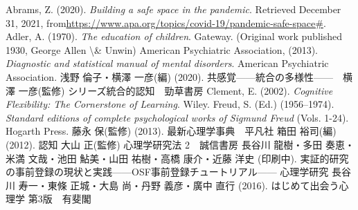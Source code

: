  Abrams, Z. (2020). \textit{Building a safe space in the pandemic}. Retrieved December 31, 2021, from\url{https://www.apa.org/topics/covid-19/pandemic-safe-space#}.
 Adler, A. (1970). \textit{The education of children}. Gateway. (Original work published 1930, George Allen \textbackslash\& Unwin)
 American Psychiatric Association, (2013). \textit{Diagnostic and statistical manual of mental disorders}. American Psychiatric Association.
 浅野 倫子・横澤 一彦(編)  (2020). 共感覚——統合の多様性——　横澤 一彦(監修) シリーズ統合的認知　勁草書房
 Clement, E. (2002). \textit{Cognitive Flexibility: The Cornerstone of Learning}. Wiley.
 Freud, S. (Ed.) (1956--1974). \textit{Standard editions of complete psychological works of Sigmund Freud} (Vols. 1-24). Hogarth Press.
 藤永 保(監修) (2013). 最新心理学事典　平凡社
 箱田 裕司(編) (2012). 認知 大山 正(監修) 心理学研究法 2　誠信書房
 長谷川 龍樹・多田 奏恵・米満 文哉・池田 鮎美・山田 祐樹・高橋 康介・近藤 洋史 (印刷中). 実証的研究の事前登録の現状と実践——OSF事前登録チュートリアル—— 心理学研究
 長谷川 寿一・東條 正城・大島 尚・丹野 義彦・廣中 直行 (2016). はじめて出会う心理学 第3版　有斐閣
